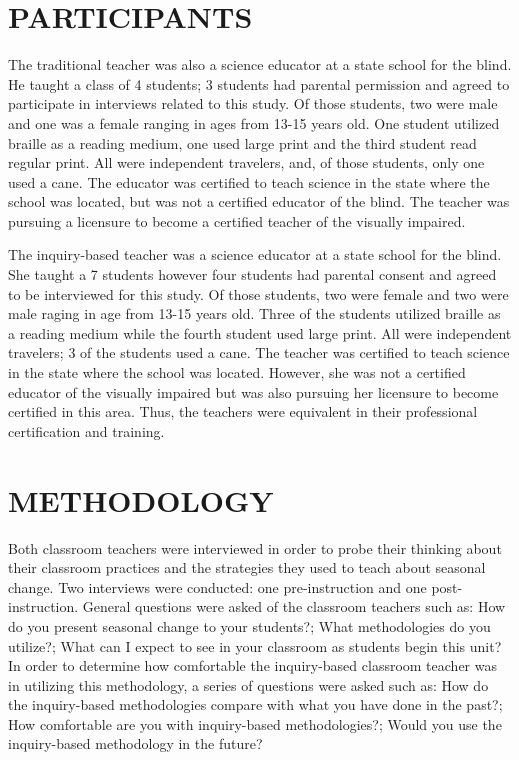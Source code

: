 \documentclass[11.5pt]{sig-alternate} %
\begin{document}
\begin{large}
\section*{PARTICIPANTS}

 The traditional teacher was also a science educator at a state school for the blind. He taught a class of 4 students; 3 students had parental permission and agreed to participate in interviews related to this study.  Of those students, two were male and one was a female ranging in ages from 13-15 years old.  One student utilized braille as a reading medium, one used large print and the third student read regular print. All were independent travelers, and, of those students, only one used a cane. The educator was certified to teach science in the state where the school was located, but was not a certified educator of the blind. The teacher was pursuing a licensure to become a certified teacher of the visually impaired.  
 
The inquiry-based teacher was a science educator at a state school for the blind. She taught a  7 students however four students had parental consent and agreed to be interviewed for this study.  Of those students, two were female and two were male raging in age from 13-15 years old.  Three of the students utilized braille as a reading medium while the fourth student used large print.  All were independent travelers; 3 of the students used a cane.  The teacher was certified to teach science in the state where the school was located. However, she was not a certified educator of the visually impaired but was also pursuing her licensure to become certified in this area. Thus, the teachers were equivalent in their professional certification and training.
 
\section*{METHODOLOGY}

Both classroom teachers were interviewed in order to probe their thinking about their classroom practices and the strategies they used to teach about seasonal change.  Two interviews were conducted: one pre-instruction and one post-instruction. General questions were asked of the classroom teachers such as: How do you present seasonal change to your students?; What methodologies do you utilize?; What can I expect to see in your classroom as students begin this unit? In order to determine how comfortable the inquiry-based classroom teacher was in utilizing this methodology, a series of questions were asked such as: How do the inquiry-based methodologies compare with what you have done in the past?; How comfortable are you with inquiry-based methodologies?; Would you use the inquiry-based methodology in the future?
  

\end{large}
\end{document}
